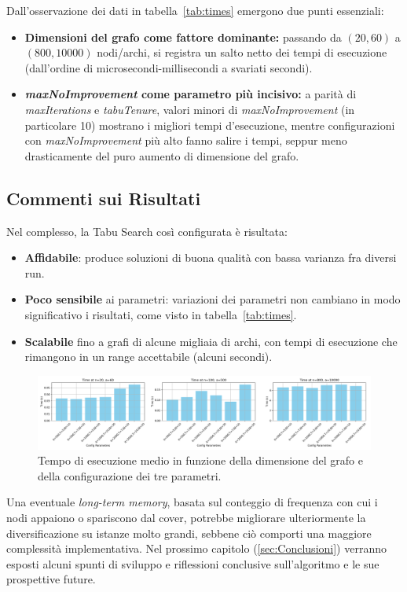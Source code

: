 \noindent
Dall’osservazione dei dati in tabella~\ref{tab:times} emergono due punti essenziali:
\begin{itemize}
    \item \textbf{Dimensioni del grafo come fattore dominante:}
    passando da \((20,60)\) a \((800,10000)\) nodi/archi, si registra un salto netto dei tempi di esecuzione (dall’ordine di microsecondi-millisecondi a svariati secondi).

    \item \textbf{\emph{maxNoImprovement} come parametro più incisivo:}
    a parità di \emph{maxIterations} e \emph{tabuTenure}, valori minori di \emph{maxNoImprovement} (in particolare 10) mostrano i migliori tempi d’esecuzione, mentre configurazioni con \emph{maxNoImprovement} più alto fanno salire i tempi, seppur meno drasticamente del puro aumento di dimensione del grafo.
\end{itemize}

\subsection{Commenti sui Risultati}

Nel complesso, la Tabu Search così configurata è risultata:
\begin{itemize}
    \item \textbf{Affidabile}: produce soluzioni di buona qualità con bassa varianza fra diversi run.
    \item \textbf{Poco sensibile} ai parametri: variazioni dei parametri non cambiano in modo significativo i risultati, come visto in tabella~\ref{tab:times}.
    \item \textbf{Scalabile} fino a grafi di alcune migliaia di archi, con tempi di esecuzione che rimangono in un range accettabile (alcuni secondi).
\end{itemize}

\begin{figure}[h!]
\centering
\includegraphics[width=1\textwidth]{images/scalability_plot.png} %
\caption{Tempo di esecuzione medio in funzione della dimensione del grafo e della configurazione dei tre parametri.}
\label{fig:scalability}
\end{figure}

Una eventuale \emph{long-term memory}, basata sul conteggio di frequenza con cui i nodi appaiono o spariscono dal cover, potrebbe migliorare ulteriormente la diversificazione su istanze molto grandi, sebbene ciò comporti una maggiore complessità implementativa. Nel prossimo capitolo (\ref{sec:Conclusioni}) verranno esposti alcuni spunti di sviluppo e riflessioni conclusive sull'algoritmo e le sue prospettive future.

